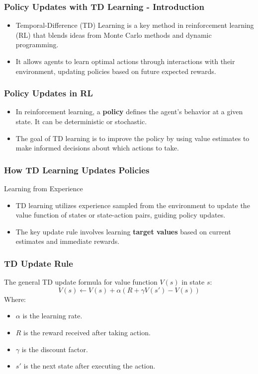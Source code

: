 \documentclass[aspectratio=169]{beamer}
\begin{document}
\begin{frame}[fragile]
    \frametitle{Policy Updates with TD Learning - Introduction}
    \begin{itemize}
        \item Temporal-Difference (TD) Learning is a key method in reinforcement learning (RL) that blends ideas from Monte Carlo methods and dynamic programming.
        \item It allows agents to learn optimal actions through interactions with their environment, updating policies based on future expected rewards.
    \end{itemize}
\end{frame}

\begin{frame}[fragile]
    \frametitle{Policy Updates in RL}
    \begin{itemize}
        \item In reinforcement learning, a \textbf{policy} defines the agent's behavior at a given state. It can be deterministic or stochastic.
        \item The goal of TD learning is to improve the policy by using value estimates to make informed decisions about which actions to take.
    \end{itemize}
\end{frame}

\begin{frame}[fragile]
    \frametitle{How TD Learning Updates Policies}
    \begin{block}{Learning from Experience}
        \begin{itemize}
            \item TD learning utilizes experience sampled from the environment to update the value function of states or state-action pairs, guiding policy updates.
            \item The key update rule involves learning \textbf{target values} based on current estimates and immediate rewards.
        \end{itemize}
    \end{block}
\end{frame}

\begin{frame}[fragile]
    \frametitle{TD Update Rule}
    The general TD update formula for value function \( V(s) \) in state \( s \):
    \begin{equation}
        V(s) \leftarrow V(s) + \alpha \left( R + \gamma V(s') - V(s) \right)
    \end{equation}
    Where:
    \begin{itemize}
        \item \( \alpha \) is the learning rate.
        \item \( R \) is the reward received after taking action.
        \item \( \gamma \) is the discount factor.
        \item \( s' \) is the next state after executing the action.
    \end{itemize}
\end{frame}
\end{document}
